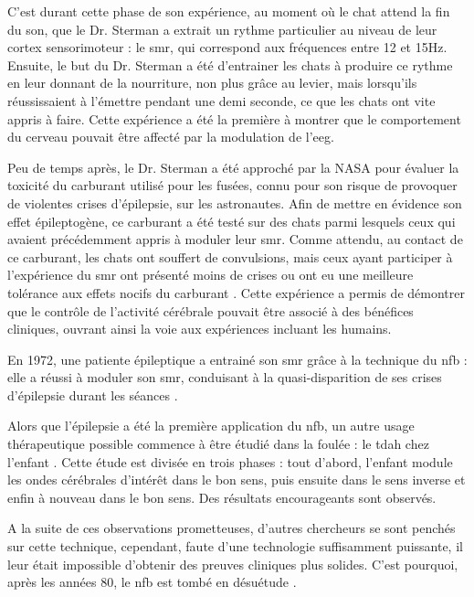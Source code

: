C'est durant cette phase de son expérience, au moment où le chat attend la fin du son, que le Dr. Sterman a extrait un rythme particulier au niveau de leur cortex sensorimoteur : 
le \gls{smr}, qui correspond aux fréquences entre 12 et 15Hz. Ensuite, le but du Dr. Sterman a été d'entrainer les chats à produire ce rythme en leur donnant de la nourriture, non plus grâce 
au levier, mais lorsqu'ils réussissaient à l'émettre pendant une demi seconde, ce que les chats ont vite appris à faire. Cette expérience a été la première à montrer que le comportement
du cerveau pouvait être affecté par la modulation de l'\gls{eeg}. 

Peu de temps après, le Dr. Sterman a été approché par la NASA pour évaluer la toxicité du carburant utilisé pour les fusées, connu pour son risque de provoquer de violentes crises
d'épilepsie, sur les astronautes. Afin de mettre en évidence son effet épileptogène, ce carburant a été testé sur des chats parmi lesquels ceux qui avaient précédemment appris 
à moduler leur \gls{smr}. Comme attendu, au contact de ce carburant, les chats
ont souffert de convulsions, mais ceux ayant participer à l'expérience du \gls{smr} ont présenté moins de crises ou ont eu une meilleure tolérance aux effets nocifs du carburant \citep{Sterman1974}.  
Cette expérience a permis de démontrer que le contrôle de l'activité cérébrale pouvait être associé à des bénéfices cliniques, ouvrant ainsi la voie aux expériences incluant les humains.

En 1972, une patiente épileptique a entrainé son \gls{smr} grâce à la technique du \gls{nfb} : elle a réussi à moduler son \gls{smr}, conduisant à la quasi-disparition de ses crises 
d'épilepsie durant les séances \citep{Sterman1974}. 

Alors que l'épilepsie a été la première application du \gls{nfb}, un autre usage thérapeutique possible commence à être étudié dans la foulée : le \gls{tdah} chez l'enfant \citet{Lubar1976ADHD}. 
Cette étude est divisée en trois phases : tout d'abord, l'enfant module les ondes cérébrales d'intérêt dans le bon sens, puis ensuite dans le sens inverse et enfin à nouveau dans le bon sens.
Des résultats encourageants sont observés.

A la suite de ces observations prometteuses, d'autres chercheurs se sont penchés sur cette technique, cependant, faute d'une technologie suffisamment puissante, il leur était impossible
d'obtenir des preuves cliniques plus solides. C'est pourquoi, après les années 80, le \gls{nfb} est tombé en désuétude \citep{Masterpasqua2003}.
 
